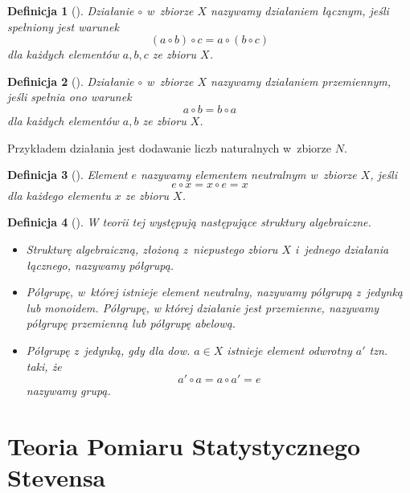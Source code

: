 \documentclass[12pt,a4paper]{report}
\newtheorem{definition}{Definicja}[chapter]
\begin{document}
\begin{definition}[{\citep[Sec 4.1 Def. 4.3]{jedrzejewski2011algebra}}]
Działanie $\circ$ w~zbiorze $X$ nazywamy działaniem łącznym, jeśli spełniony jest warunek 
\begin{equation*}
(a\circ b)\circ c = a\circ(b\circ c)
\end{equation*} 
dla każdych elementów $a,b,c$ ze zbioru $X$.
\end{definition}
\begin{definition}[{\citep[Sec 4.1 Def. 4.4]{jedrzejewski2011algebra}}]
Działanie $\circ$ w~zbiorze $X$ nazywamy działaniem przemiennym, jeśli spełnia ono warunek
\begin{equation*}
a\circ b=b\circ a
\end{equation*}
dla każdych elementów $a,b$ ze zbioru $X$.
\end{definition}
Przykładem działania jest dodawanie liczb naturalnych w~zbiorze $N$.
\begin{definition}[{\citep[Sec 4.1 Def. 4.8]{jedrzejewski2011algebra}}]
Element $e$ nazywamy elementem neutralnym w~zbiorze $X$, jeśli 
\begin{equation*}
e\circ x = x\circ e = x
\end{equation*}
dla każdego elementu $x$ ze zbioru $X$.
\end{definition}


\begin{definition}[{\citep[Sec 4.2]{jedrzejewski2011algebra}}]
W teorii tej występują następujące struktury algebraiczne.
\begin{itemize}
\item
Strukturę algebraiczną, złożoną z~niepustego zbioru $X$ i~jednego działania łącznego, nazywamy półgrupą.
\item
Półgrupę, w~której istnieje element neutralny, nazywamy półgrupą z~jedynką lub monoidem. Półgrupę, w której działanie jest przemienne, nazywamy półgrupę przemienną lub półgrupę abelową. 
\item
Półgrupę z~jedynką, gdy dla dow. $a \in X$ istnieje element odwrotny $a'$ tzn. taki, że 
$$
a'\circ a = a \circ a' =e
$$
nazywamy grupą.
\end{itemize}
\end{definition}




\chapter{Teoria Pomiaru Statystycznego Stevensa}
\end{document}

